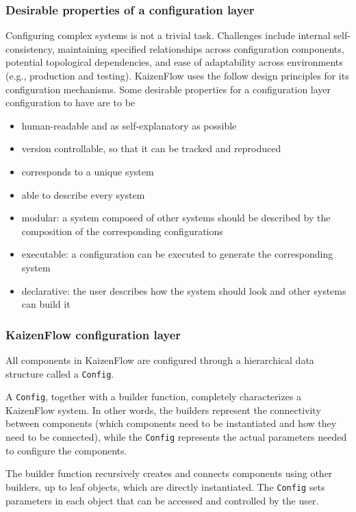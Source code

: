\documentclass[11pt, reqno]{amsart}
\theoremstyle{definition}
\theoremstyle{remark}
\begin{document}
\subsubsection{Desirable properties of a configuration layer}
Configuring complex systems is not a trivial task. Challenges include
internal self-consistency, maintaining specified relationships across
configuration components, potential topological dependencies, and ease of
adaptability across environments (e.g., production and testing).
KaizenFlow uses the
follow design principles for its configuration mechanisms. Some desirable
properties for a configuration layer configuration to have are to be

\begin{itemize}
  \item human-readable and as self-explanatory as possible
  \item version controllable, so that it can be tracked and reproduced
  \item corresponds to a unique system
  \item able to describe every system
  \item modular: a system composed of other systems should be described by the
        composition of the corresponding configurations
  \item executable: a configuration can be executed to generate the
        corresponding system
  \item declarative: the user describes how the system should look and
        other systems can build it
\end{itemize}

\subsubsection{KaizenFlow configuration layer}
All components in KaizenFlow are configured through a hierarchical data structure
called a \verb|Config|.

A \verb|Config|, together with a builder function, completely characterizes a
KaizenFlow system. In other words, the builders represent the connectivity
between components (which components need to be instantiated and how they need
to be connected), while the \verb|Config| represents the actual parameters needed to
configure the components.

The builder function recursively creates and connects components using other
builders, up to leaf objects, which are directly instantiated.
The \verb|Config| sets parameters in each object that can be accessed and
controlled by the user.
\end{document}
